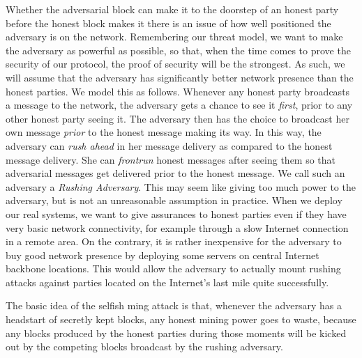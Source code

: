 Whether the adversarial block can make it to the doorstep of an honest party before the
honest block makes it there is an issue of how well positioned the adversary is on the
network. Remembering our threat model, we want to make the adversary as powerful as possible,
so that, when the time comes to prove the security of our protocol, the proof of security
will be the strongest. As such, we will assume that the adversary has significantly better
network presence than the honest parties. We model this as follows. Whenever any honest party
broadcasts a message to the network, the adversary gets a chance to see it \emph{first},
prior to any other honest party seeing it. The adversary then has the choice to broadcast
her own message \emph{prior} to the honest message making its way. In this way, the adversary
can \emph{rush ahead} in her message delivery as compared to the honest message delivery.
She can \emph{frontrun} honest messages after seeing them so that adversarial messages
get delivered prior to the honest message. We call such an adversary a
\emph{Rushing Adversary}. This may seem like giving too much power
to the adversary, but is not an unreasonable assumption in practice. When we deploy our real
systems, we want to give assurances to honest parties even if they have very basic network
connectivity, for example through a slow Internet connection in a remote area. On the contrary,
it is rather inexpensive for the adversary to buy good network presence by deploying some
servers on central Internet backbone locations. This would allow the adversary to actually
mount rushing attacks against parties located on the Internet's last mile quite successfully.


The basic idea of the selfish ming attack is that, whenever the adversary has a headstart of secretly
kept blocks, any honest mining power goes to waste, because any blocks produced by the honest
parties during those moments will be kicked out by the competing blocks broadcast by the rushing
adversary.

